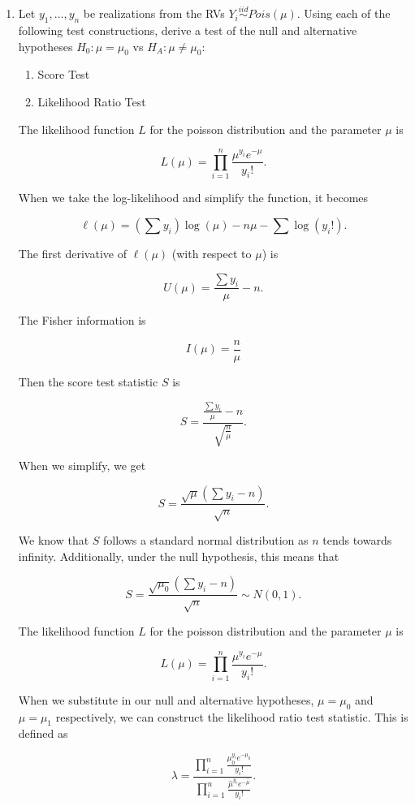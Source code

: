 \documentclass{article}
\begin{document}
	\begin{enumerate}
		\item Let $y_1, \ldots, y_n$ be realizations from the RVs $Y_i \stackrel{iid}{\sim} Pois(\mu)$. Using each of the following test constructions, derive a test of the null and alternative hypotheses $H_0: \mu = \mu_0$ vs $H_A: \mu \neq \mu_0$:
		\begin{enumerate}
			\item Score Test
			\item Likelihood Ratio Test
		\end{enumerate}

		The likelihood function $L$ for the poisson distribution and the parameter $\mu$ is 


		$$L(\mu) = \prod_{i=1}^{n} \frac{\mu^{y_i} e^{-\mu}}{y_i!}.$$

		When we take the log-likelihood and simplify the function, it becomes 

		$$\ell(\mu) = \left( \sum y_i \right) \log(\mu) - n\mu - \sum \log(y_i!).$$

		The first derivative of $\ell(\mu)$ (with respect to $\mu$) is

		$$U(\mu) = \frac{\sum y_i}{\mu} - n.$$

		The Fisher information is

		$$I(\mu) = \frac{n}{\mu}$$

		Then the score test statistic $S$ is

		$$S = \frac{\frac{\sum y_i}{\mu} - n}{\sqrt{\frac{n}{\mu}}}.$$

		When we simplify, we get

		$$S = \frac{\sqrt{\mu}(\sum y_i - n )}{\sqrt{n}}.$$

		We know that $S$ follows a standard normal distribution as $n$ tends towards infinity. Additionally, under the null hypothesis, this means that

		$$S = \frac{\sqrt{\mu_0}(\sum y_i - n )}{\sqrt{n}} \sim N(0, 1).$$

		\newpage
		
		The likelihood function $L$ for the poisson distribution and the parameter $\mu$ is 


		$$L(\mu) = \prod_{i=1}^{n} \frac{\mu^{y_i} e^{-\mu}}{y_i!}.$$

		When we substitute in our null and alternative hypotheses, $\mu = \mu_0$ and $\mu = \mu_1$ respectively, we can construct the likelihood ratio test statistic. This is defined as

		$$\lambda = \frac{\prod_{i=1}^{n} \frac{\mu_0^{y_i} e^{-\mu_0}}{y_i!}}{\prod_{i=1}^{n} \frac{\hat{\mu}^{y_i} e^{-\hat{\mu}}}{y_i!}}.$$


\end{enumerate}
\end{document}
